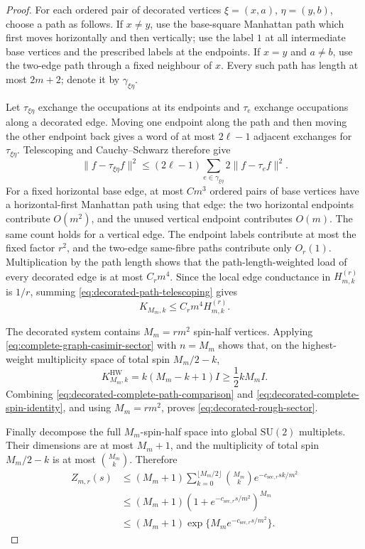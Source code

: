 \documentclass[11pt]{article}
\numberwithin{equation}{section}
\theoremstyle{remark}
\newcommand{\1}{\mathbf 1}
\begin{document}
\begin{proof}
For each ordered pair of decorated vertices
\(\xi=(x,a)\), \(\eta=(y,b)\), choose a path as follows.  If \(x\ne y\),
use the base-square Manhattan path which first moves horizontally and then
vertically; use the label \(1\) at all intermediate base vertices and the
prescribed labels at the endpoints.  If \(x=y\) and \(a\ne b\), use the
two-edge path through a fixed neighbour of \(x\).  Every such path has
length at most \(2m+2\); denote it by \(\gamma_{\xi\eta}\).

Let \(\tau_{\xi\eta}\) exchange the occupations at its endpoints and
\(\tau_e\) exchange occupations along a decorated edge.  Moving one
endpoint along the path and then moving the other endpoint back gives a
word of at most \(2\ell-1\) adjacent exchanges for
\(\tau_{\xi\eta}\).  Telescoping and Cauchy--Schwarz therefore give
\begin{equation}
 \|f-\tau_{\xi\eta}f\|^2
 \leq(2\ell-1)\sum_{e\in\gamma_{\xi\eta}}2
 \|f-\tau_ef\|^2.
 \label{eq:decorated-path-telescoping}
\end{equation}
For a fixed horizontal base edge, at most \(Cm^3\) ordered pairs of base
vertices have a horizontal-first Manhattan path using that edge: the two
horizontal endpoints contribute \(O(m^2)\), and the unused vertical
endpoint contributes \(O(m)\).  The same count holds for a vertical edge.
The endpoint labels contribute at most the fixed factor \(r^2\), and the
two-edge same-fibre paths contribute only \(O_r(1)\).  Multiplication by
the path length shows that the path-length-weighted load of every
decorated edge is at most \(C_rm^4\).  Since the local edge conductance in
\(H_{m,k}^{(r)}\) is \(1/r\), summing
\eqref{eq:decorated-path-telescoping} gives
\begin{equation}
 K_{M_m,k}\leq C_rm^4H_{m,k}^{(r)}.
 \label{eq:decorated-complete-path-comparison}
\end{equation}

The decorated system contains \(M_m=rm^2\) spin-half vertices.  Applying
\eqref{eq:complete-graph-casimir-sector} with \(n=M_m\) shows that, on
the highest-weight multiplicity space of total spin \(M_m/2-k\),
\begin{equation}
 K_{M_m,k}^{\mathrm{HW}}=k(M_m-k+1)I
 \geq\frac12kM_mI.
 \label{eq:decorated-complete-spin-identity}
\end{equation}
Combining \eqref{eq:decorated-complete-path-comparison} and
\eqref{eq:decorated-complete-spin-identity}, and using \(M_m=rm^2\), proves
\eqref{eq:decorated-rough-sector}.

Finally decompose the full \(M_m\)-spin-half space into global
\(\mathrm{SU}(2)\) multiplets.  Their dimensions are at most \(M_m+1\),
and the multiplicity of total spin \(M_m/2-k\) is at most
\(\binom{M_m}{k}\).  Therefore
\begin{align*}
 Z_{m,r}(s)
 &\leq(M_m+1)\sum_{k=0}^{\lfloor M_m/2\rfloor}
 \binom{M_m}{k}e^{-c_{\mathrm{sec},r}sk/m^2}\\
 &\leq(M_m+1)
 (1+e^{-c_{\mathrm{sec},r}s/m^2})^{M_m}\\
 &\leq(M_m+1)\exp\{M_m e^{-c_{\mathrm{sec},r}s/m^2}\}.
\end{align*}
\end{proof}
\end{document}
